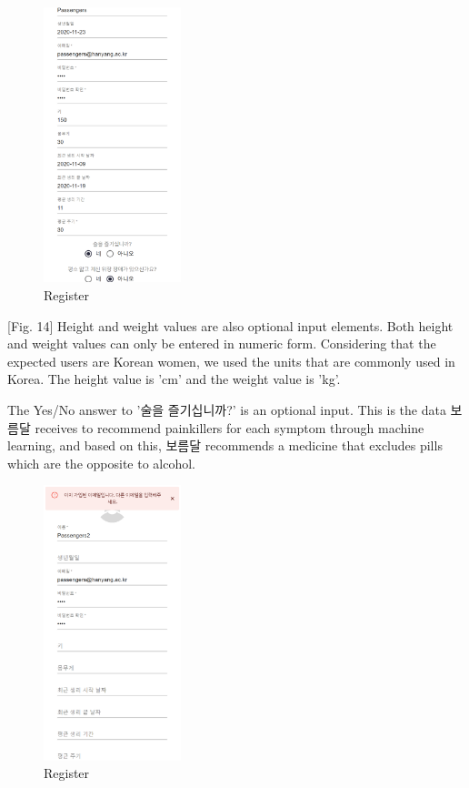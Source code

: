 \documentclass[conference]{IEEEtran}
\begin{document}
\begin{itemize}
    \begin{figure}[htbp]
    \includegraphics[width=4cm, height=8cm, center]{speregifill.png}
    \caption{Register}
    \label{fig14}
    \end{figure}
    
    [Fig. 14] Height and weight values are also optional input elements. Both height and weight values can only be entered in numeric form. Considering that the expected users are Korean women, we used the units that are commonly used in Korea. The height value is 'cm' and the weight value is 'kg'. 
    
    The Yes/No answer to '술을 즐기십니까?' is an optional input. This is the data 보름달 receives to recommend painkillers for each symptom through machine learning, and based on this, 보름달 recommends a medicine that excludes pills which are the opposite to alcohol.
    
    \begin{figure}[htbp]
    \includegraphics[width=4cm, height=8cm, center]{register10.png}
    \caption{Register}
    \label{fig15}
    \end{figure}
    

\end{itemize}
\end{document}
